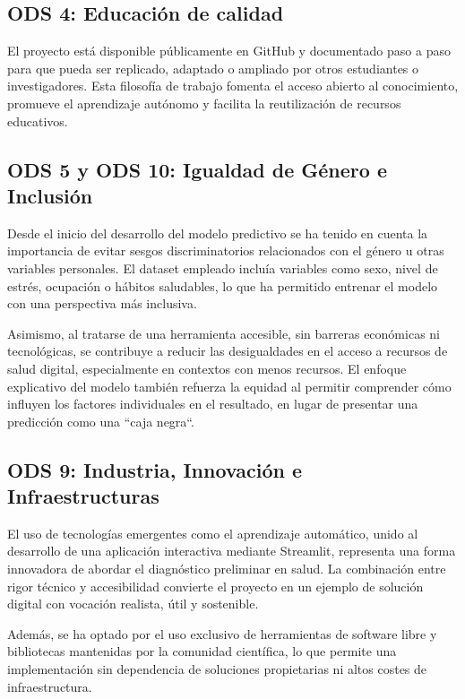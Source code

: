  
\subsection{ODS 4: Educación de calidad}
El proyecto está disponible públicamente en GitHub y documentado paso a paso para que pueda ser replicado, adaptado o ampliado por otros estudiantes o investigadores. Esta filosofía de trabajo fomenta el acceso abierto al conocimiento, promueve el aprendizaje autónomo y facilita la reutilización de recursos educativos. 

\subsection{ODS 5 y ODS 10: Igualdad de Género e Inclusión}
Desde el inicio del desarrollo del modelo predictivo se ha tenido en cuenta la importancia de evitar sesgos discriminatorios relacionados con el género u otras variables personales. El dataset empleado incluía variables como sexo, nivel de estrés, ocupación o hábitos saludables, lo que ha permitido entrenar el modelo con una perspectiva más inclusiva.

Asimismo, al tratarse de una herramienta accesible, sin barreras económicas ni tecnológicas, se contribuye a reducir las desigualdades en el acceso a recursos de salud digital, especialmente en contextos con menos recursos. El enfoque explicativo del modelo también refuerza la equidad al permitir comprender cómo influyen los factores individuales en el resultado, en lugar de presentar una predicción como una ``caja negra``.

 


\subsection{ODS 9: Industria, Innovación e Infraestructuras}
El uso de tecnologías emergentes como el aprendizaje automático, unido al desarrollo de una aplicación interactiva mediante Streamlit, representa una forma innovadora de abordar el diagnóstico preliminar en salud. La combinación entre rigor técnico y accesibilidad convierte el proyecto en un ejemplo de solución digital con vocación realista, útil y sostenible.

Además, se ha optado por el uso exclusivo de herramientas de software libre y bibliotecas mantenidas por la comunidad científica, lo que permite una implementación sin dependencia de soluciones propietarias ni altos costes de infraestructura.

